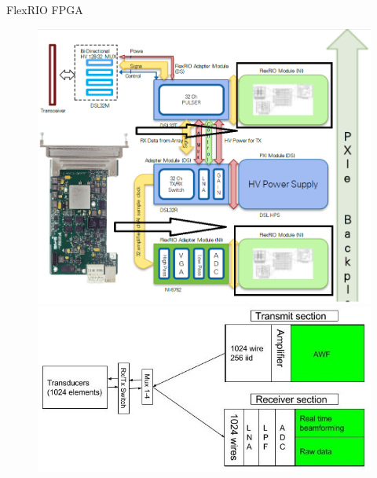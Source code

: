 \documentclass[t,12pt,english
\ifx\beamermode\undefined\else,\beamermode\fi
]{beamer}
\begin{document}
\begin{frame}{FlexRIO FPGA}

\begin{figure}[!htb]
\includegraphics[width=.95\textwidth]{2_7.png}
\endminipage
{}
\includegraphics[width=1\textwidth,left]{54.jpg}
\endminipage
\end{figure}

\end{frame}
\end{document}
